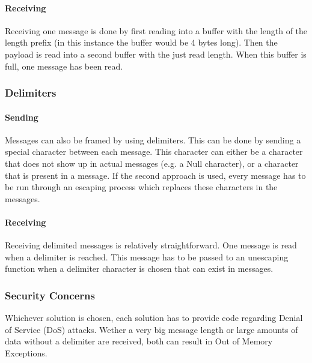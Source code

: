 \paragraph{Receiving}

Receiving one message is done by first reading into a buffer with the length of the length prefix (in this instance the buffer would be 4 bytes long). Then the payload is read into a second buffer with the just read length. When this buffer is full, one message has been read.

\subsubsection{Delimiters}

\paragraph{Sending}

Messages can also be framed by using delimiters. This can be done by sending a special character between each message. This character can either be a character that does not show up in actual messages (e.g. a Null character), or a character that is present in a message. If the second approach is used, every message has to be run through an escaping process which replaces these characters in the messages.

\paragraph{Receiving}

Receiving delimited messages is relatively straightforward. One message is read when a delimiter is reached. This message has to be passed to an unescaping function when a delimiter character is chosen that can exist in messages.

\subsubsection{Security Concerns}

Whichever solution is chosen, each solution has to provide code regarding Denial of Service (DoS) attacks. Wether a very big message length or large amounts of data without a delimiter are received, both can result in Out of Memory Exceptions.
